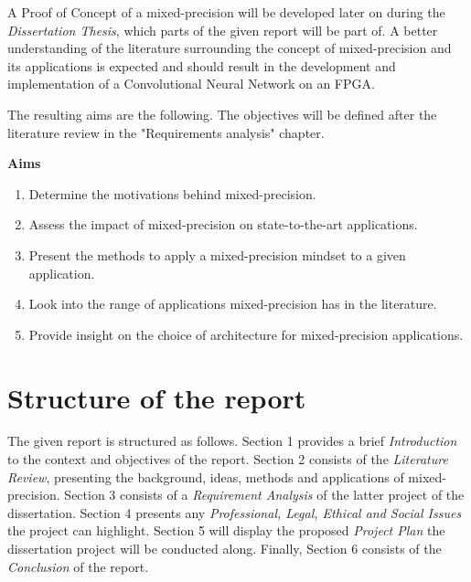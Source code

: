 A Proof of Concept of a mixed-precision will be developed later on during the \emph{Dissertation Thesis}, which parts of the given report will be part of. A better understanding of the literature surrounding the concept of mixed-precision and its applications is expected and should result in the development and implementation of a Convolutional Neural Network on an FPGA.

The resulting aims are the following. The objectives will be defined after the literature review in the "Requirements analysis" chapter.

\textbf{Aims}
\begin{enumerate}
  \item Determine the motivations behind mixed-precision.
  \item Assess the impact of mixed-precision on state-to-the-art applications.
  \item Present the methods to apply a mixed-precision mindset to a given application.
  \item Look into the range of applications mixed-precision has in the literature.
  \item Provide insight on the choice of architecture for mixed-precision applications.
\end{enumerate}


\section{Structure of the report}

The given report is structured as follows. Section 1 provides a brief \emph{Introduction} to the context and objectives of the report. Section 2 consists of the \emph{Literature Review}, presenting the background, ideas, methods and applications of mixed-precision. Section 3 consists of a \emph{Requirement Analysis} of the latter project of the dissertation. Section 4 presents any \emph{Professional, Legal, Ethical and Social Issues} the project can highlight. Section 5 will display the proposed \emph{Project Plan} the dissertation project will be conducted along. Finally, Section 6 consists of the \emph{Conclusion} of the report.
